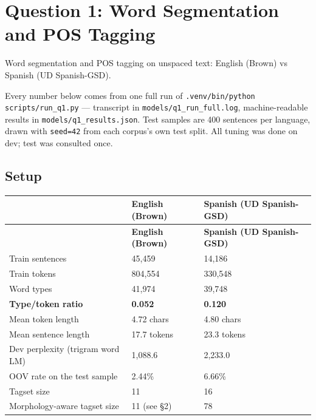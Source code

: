 \documentclass[11pt,a4paper]{article}
\begin{document}
\clearpage
\section*{Question 1: Word Segmentation and POS Tagging}

Word segmentation and POS tagging on unspaced text: English (Brown) vs Spanish (UD Spanish-GSD).

Every number below comes from one full run of \texttt{.\allowbreak{}venv/\allowbreak{}bin/\allowbreak{}python scripts/\allowbreak{}run\_\allowbreak{}q1.\allowbreak{}py} --- transcript in \texttt{models/\allowbreak{}q1\_\allowbreak{}run\_\allowbreak{}full.\allowbreak{}log}, machine-readable results in \texttt{models/\allowbreak{}q1\_\allowbreak{}results.\allowbreak{}json}. Test samples are 400 sentences per language, drawn with \texttt{seed=42} from each corpus's own test split. All tuning was done on dev; test was consulted once.

\subsection*{Setup}

{\small
\setlength{\tabcolsep}{4pt}
\begin{longtable}{lll}
\toprule
 & \textbf{English (Brown)} & \textbf{Spanish (UD Spanish-GSD)} \\
\midrule
\endfirsthead
\toprule
 & \textbf{English (Brown)} & \textbf{Spanish (UD Spanish-GSD)} \\
\midrule
\endhead
Train sentences & 45,459 & 14,186 \\
Train tokens & 804,554 & 330,548 \\
Word types & 41,974 & 39,748 \\
\textbf{Type/token ratio} & \textbf{0.052} & \textbf{0.120} \\
Mean token length & 4.72 chars & 4.80 chars \\
Mean sentence length & 17.7 tokens & 23.3 tokens \\
Dev perplexity (trigram word LM) & 1,088.6 & 2,233.0 \\
OOV rate on the test sample & 2.44\% & 6.66\% \\
Tagset size & 11 & 16 \\
Morphology-aware tagset size & 11 (see \S{}2) & 78 \\
\bottomrule
\end{longtable}}
\end{document}
